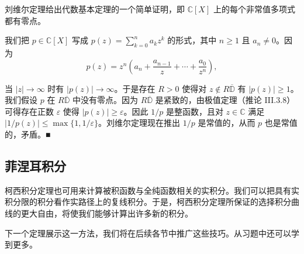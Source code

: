 \begin{application}

刘维尔定理给出代数基本定理的一个简单证明，即 $ \mathbb{C}[X] $ 上的每个非常值多项式都有零点。

\proofhead
我们把 $ p \in \mathbb{C}[X] $ 写成 $ p(z) = \sum_{k=0}^{n}a_{k}z^{k} $ 的形式，其中 $ n \ge 1 $ 且 $ a_{n} \ne 0 $。因为
\[
p(z) = z^{n}\left(a_{n} + \frac{a_{n-1}}{z} + \cdots + \frac{a_{0}}{z^{n}}\right) ,
\]

当 $ |z| \to \infty $ 时有 $ |p(z)| \to \infty $。于是存在 $ R > 0 $ 使得对 $ z \notin R\overline{\mathbb{D}} $ 有 $ |p(z)| \ge 1 $。我们假设 $ p $ 在 $ R\overline{\mathbb{D}} $ 中没有零点。因为 $ R\overline{\mathbb{D}} $ 是紧致的，由极值定理（推论 III.3.8）可得存在正数 $ \varepsilon $ 使得 $ |p(z)| \ge \varepsilon $。因此 $ 1/p $ 是整函数，且对 $ z \in \mathbb{C} $ 满足 $ |1/p(z)| \le \max\{1,1/\varepsilon\} $。刘维尔定理现在推出 $ 1/p $ 是常值的，从而 $ p $ 也是常值的，矛盾。\nobreak\hspace{0.35em}■

\end{application}

\subsection*{菲涅耳积分}

柯西积分定理也可用来计算被积函数与全纯函数相关的实积分。我们可以把具有实积分限的积分看作实路径上的复线积分。于是，柯西积分定理所保证的选择积分曲线的更大自由，将使我们能够计算出许多新的积分。

下一个定理展示这一方法，我们将在后续各节中推广这些技巧。从习题中还可以学到更多。

